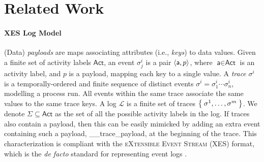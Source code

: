 \section{Related Work}


\paragraph*{XES Log Model}\label{sec:XES}


(Data) \textit{payloads} are maps  associating attributes (i.e., \textit{keys}) to data values. 
Given a finite set of activity labels $\textsf{Act}$, an event $\sigma_j^{i}$ is a pair $\Braket{\textsf{a},p}$, where $\textsf{a}\in\textsf{Act}$ is an activity label, and $p$ is a payload, mapping each key to a single value. 
A \textit{trace} $\sigma^i$ is a temporally-ordered and finite sequence of distinct events $\sigma^i=\sigma_1^i\cdots\sigma_n^i$, modelling a process run. 
All events within the same trace associate the same values to the same trace keys. 
A log $\mathcal{L}$ is a finite set of traces $\Set{\sigma^1,\dots,\sigma^m}$. We denote  $\Sigma\subseteq\textsf{Act}$ as the set of all the possible activity labels in the log. If traces also contain a payload, then this can be easily mimicked by adding an extra event containing such a payload, \textsf{\_\_trace\_payload}, at the beginning of the trace. This  characterization \cite{bpm21} is compliant with the \textsc{eXtensible Event Stream} (XES) format, which is the \textit{de facto} standard for representing event logs %
\cite{XES}. 